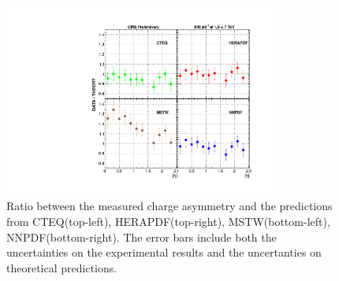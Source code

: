 \begin{figure}[htbp]
  \begin{center}
\includegraphics*[width=0.80\textwidth]{plotCarino}
  \caption{\label{fig:Carino} Ratio between the measured charge asymmetry
and the predictions from CTEQ(top-left), HERAPDF(top-right), MSTW(bottom-left),
NNPDF(bottom-right). The error bars include both the uncertainties on the
experimental results and the uncertanties on theoretical
predictions\cite{bendavid2011electron}.}
  \end{center}
\end{figure}

